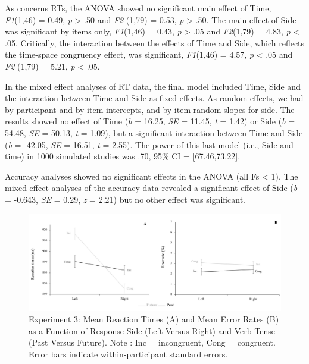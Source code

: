 \documentclass[
  a4paper,12pt,twoside,onecolumn,openright,final,oldfontcommands]{memoir}
\begin{document}
As concerns RTs, the ANOVA showed no significant main effect of Time, \emph{F1}(1,46) = 0.49, \emph{p} \textgreater{} .50 and \emph{F2} (1,79) = 0.53, \emph{p} \textgreater{} .50. The main effect of Side was significant by items only, \emph{F1}(1,46) = 0.43, \emph{p} \textgreater{} .05 and \emph{F2}(1,79) = 4.83, \emph{p} \textless{} .05. Critically, the interaction between the effects of Time and Side, which reflects the time-space congruency effect, was significant, \emph{F1}(1,46) = 4.57, \emph{p} \textless{} .05 and \emph{F2} (1,79) = 5.21, \emph{p} \textless{} .05.

In the mixed effect analyses of RT data, the final model included Time, Side and the interaction between Time and Side as fixed effects. As random effects, we had by-participant and by-item intercepts, and by-item random slopes for side. The results showed no effect of Time (\emph{b} = 16.25, \emph{SE} = 11.45, \emph{t} = 1.42) or Side (\emph{b} = 54.48, \emph{SE} = 50.13, \emph{t} = 1.09), but a significant interaction between Time and Side (\emph{b} = -42.05, \emph{SE} = 16.51, \emph{t} = 2.55). The power of this last model (i.e., Side and time) in 1000 simulated studies was .70, 95\% CI = {[}67.46,73.22{]}.

Accuracy analyses showed no significant effects in the ANOVA (all Fs \textless{} 1). The mixed effect analyses of the accuracy data revealed a significant effect of Side (\emph{b} = -0.643, \emph{SE} = 0.29, \emph{z} = 2.21) but no other effect was significant.

\begin{figure}[htbp!]

{\centering \includegraphics[width=1\linewidth]{figures/chap-3-fig5} 

}

\caption{Experiment 3: Mean Reaction Times (A) and Mean Error Rates (B) as a Function of Response Side (Left Versus Right) and Verb Tense (Past Versus Future). Note : Inc = incongruent, Cong = congruent. Error bars indicate within-participant standard errors.}\label{fig:chap-3-fig5}
\end{figure}
\end{document}
